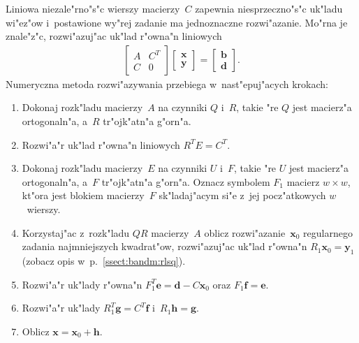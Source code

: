 Liniowa niezale"rno"s"c wierszy macierzy~$C$ zapewnia niesprzeczno"s"c uk"ladu
wi"ez"ow i~postawione wy"rej zadanie ma jednoznaczne rozwi"azanie. Mo"rna je
znale"z"c, rozwi"azuj"ac uk"lad r"owna"n liniowych
\begin{align*}
  \left[\begin{array}{cc} A & C^T \\ C & 0 \end{array}\right]
  \left[\begin{array}{c} \bm{x} \\ \bm{y} \end{array}\right] =
  \left[\begin{array}{c} \bm{b} \\ \bm{d} \end{array}\right].
\end{align*}
Numeryczna metoda rozwi"azywania przebiega w~nast"epuj"acych krokach:
\begin{enumerate}
  \item Dokonaj rozk"ladu macierzy~$A$ na czynniki $Q$ i~$R$,
    takie "re $Q$ jest macierz"a ortogonaln"a, a~$R$ tr"ojk"atn"a g"orn"a.
  \item Rozwi"a"r uk"lad r"owna"n liniowych $R^TE=C^T$.
  \item Dokonaj rozk"ladu macierzy~$E$ na czynniki $U$ i~$F$,
    takie "re $U$ jest macierz"a ortogonaln"a, a~$F$ tr"ojk"atn"a g"orn"a.
    Oznacz symbolem $F_1$ macierz $w\times w$, kt"ora jest blokiem macierzy~$F$
    sk"ladaj"acym si"e z~jej pocz"atkowych $w$~wierszy.
  \item Korzystaj"ac z~rozk"ladu $QR$ macierzy~$A$ oblicz
    rozwi"azanie~$\bm{x}_0$ regularnego zadania najmniejszych kwadrat"ow,
    rozwi"azuj"ac uk"lad r"owna"n $R_1\bm{x}_0=\bm{y}_1$ (zobacz opis
    w~p.~\ref{ssect:bandm:rlsq}).
  \item Rozwi"a"r uk"lady r"owna"n $F_1^T\bm{e}=\bm{d}-C\bm{x}_0$ oraz
    $F_1\bm{f}=\bm{e}$.
  \item Rozwi"a"r uk"lady $R_1^T\bm{g}=C^T\bm{f}$ i~$R_1\bm{h}=\bm{g}$.
  \item Oblicz $\bm{x}=\bm{x}_0+\bm{h}$.
\end{enumerate}

